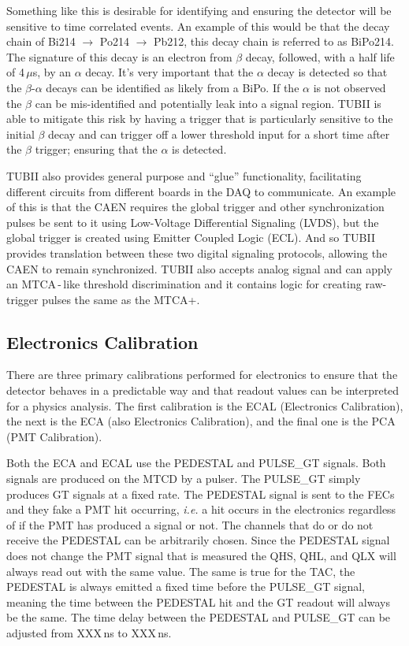 Something like this is desirable for identifying and ensuring the detector will
be sensitive to time correlated events. An example of this would be that
the decay chain of Bi214 $\rightarrow$ Po214 $\rightarrow$ Pb212, this decay chain is referred to as BiPo214. %
The signature of this decay is an electron from $\beta$ decay, followed, with a half
life of 4\,$\mu$s, by an $\alpha$ decay.
It's very important that the $\alpha$ decay is detected so that the $\beta$-$\alpha$
decays can be identified as likely from a BiPo. If the $\alpha$ is not observed
the $\beta$ can be mis-identified and potentially leak into a signal region.
TUBII is able to mitigate this risk by having a trigger that is particularly
sensitive to the initial $\beta$ decay and can trigger off a lower
threshold input for a short time after the $\beta$ trigger; ensuring that
the $\alpha$ is detected.

TUBII also provides general purpose and ``glue'' functionality,
facilitating different circuits from different boards in the DAQ to communicate.
An example of this is that the CAEN requires the global trigger and
other synchronization pulses be sent to it using Low-Voltage Differential
Signaling (LVDS), but the global trigger is created using Emitter Coupled
Logic (ECL).
And so TUBII provides translation between these two digital signaling protocols,
allowing the CAEN to remain synchronized.
TUBII also accepts analog signal and can apply an MTCA\,-\,like threshold
discrimination and it contains logic for creating raw-trigger pulses the
same as the MTCA+.

\subsection{Electronics Calibration}
There are three primary calibrations performed for electronics to ensure that the
detector behaves in a predictable way and that readout values can be interpreted
for a physics analysis. The first calibration is the ECAL (Electronics Calibration),
the next is the ECA (also Electronics Calibration), and the final one is the PCA (PMT
Calibration).

Both the ECA and ECAL use the PEDESTAL and PULSE\_GT signals. Both signals
are produced on the MTCD by a pulser.
The PULSE\_GT simply produces GT signals at a fixed rate.
The PEDESTAL signal is sent to the FECs and they fake a PMT hit occurring,
\textit{i.e.} a hit occurs in the electronics regardless of if the PMT has
produced a signal or not.
The channels that do or do not receive the PEDESTAL can be arbitrarily chosen.
Since the PEDESTAL signal does not change the PMT signal that is measured the
QHS, QHL, and QLX will always read out with the same value. The same is true
for the TAC, the PEDESTAL is always emitted a fixed time before the PULSE\_GT
signal, meaning the time between the PEDESTAL hit and the GT readout will always
be the same.
The time delay between the PEDESTAL and PULSE\_GT can be adjusted from
XXX\,ns to XXX\,ns.



